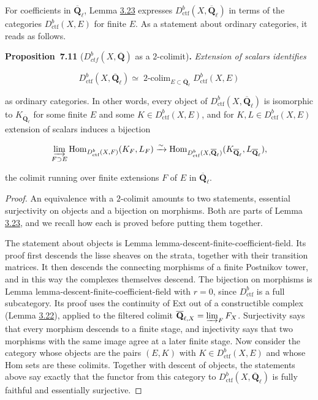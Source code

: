 \documentclass[11pt]{article}
\newenvironment{bpstatement}[2]{\par\addvspace{0.6\baselineskip}\noindent\textbf{#1}#2\textbf{.}\enspace\ignorespaces}
  {\par\addvspace{0.4\baselineskip}}
\newenvironment{bpstatementit}[2]{\begin{bpstatement}{#1}{#2}\itshape\ignorespaces}{\end{bpstatement}}
\providecommand{\Dctf}{}\renewcommand{\Dctf}{D^b_{ctf}}
\providecommand{\Hom}{}\renewcommand{\Hom}{\operatorname{Hom}}
\providecommand{\Qbar}{}\renewcommand{\Qbar}{\overline{\mathbf Q}}
\providecommand{\QbarX}{}\renewcommand{\QbarX}{\overline{\mathbf Q}_{\ell,X}}
\begin{document}
For coefficients in \(\overline{\mathbf Q}_\ell\), Lemma \hyperref[bp265]{3.23} expresses \(D^b_{\mathrm{ctf}}(X,\overline{\mathbf Q}_\ell)\) in terms of the categories \(D^b_{\mathrm{ctf}}(X,E)\) for finite \(E\). As a statement about ordinary categories, it reads as follows.

\label{bp629}%
\begin{bpstatementit}{Proposition~7.11}{ ($\Dctf(X,\Qbar)$ as a $2$-colimit)}
Extension of scalars identifies

\[
D^b_{\mathrm{ctf}}(X,\overline{\mathbf Q}_\ell)\simeq\mathop{\text{2-colim}}_{E\subset\overline{\mathbf Q}_\ell}D^b_{\mathrm{ctf}}(X,E)
\]

as ordinary categories. In other words, every object of \(D^b_{\mathrm{ctf}}(X,\overline{\mathbf Q}_\ell)\) is isomorphic to \(K_{\overline{\mathbf Q}_\ell}\) for some finite \(E\) and some \(K\in D^b_{\mathrm{ctf}}(X,E)\), and for \(K,L\in D^b_{\mathrm{ctf}}(X,E)\) extension of scalars induces a bijection

\[
\varinjlim_{F\supset E}\Hom_{D^b_{\mathrm{ctf}}(X,F)}(K_F,L_F)
\xrightarrow{\sim}\Hom_{D^b_{\mathrm{ctf}}(X,\overline{\mathbf Q}_\ell)}(K_{\overline{\mathbf Q}_\ell},L_{\overline{\mathbf Q}_\ell}),
\]

the colimit running over finite extensions \(F\) of \(E\) in \(\overline{\mathbf Q}_\ell\).
\end{bpstatementit}

\begin{proof}[{Proof}]\label{bp630}%
An equivalence with a \(2\)-colimit amounts to two statements, essential surjectivity on objects and a bijection on morphisms. Both are parts of Lemma \hyperref[bp265]{3.23}, and we recall how each is proved before putting them together.

The statement about objects is Lemma lemma-descent-finite-coefficient-field. Its proof first descends the lisse sheaves on the strata, together with their transition matrices. It then descends the connecting morphisms of a finite Postnikov tower, and in this way the complexes themselves descend. The bijection on morphisms is Lemma lemma-descent-finite-coefficient-field with \(r=0\), since \(D^b_{\mathrm{ctf}}\) is a full subcategory. Its proof uses the continuity of Ext out of a constructible complex (Lemma \hyperref[bp260]{3.22}), applied to the filtered colimit \(\QbarX=\varinjlim_F F_X\). Surjectivity says that every morphism descends to a finite stage, and injectivity says that two morphisms with the same image agree at a later finite stage. Now consider the category whose objects are the pairs \((E,K)\) with \(K\in D^b_{\mathrm{ctf}}(X,E)\) and whose Hom sets are these colimits. Together with descent of objects, the statements above say exactly that the functor from this category to \(D^b_{\mathrm{ctf}}(X,\overline{\mathbf Q}_\ell)\) is fully faithful and essentially surjective.
\end{proof}
\end{document}
